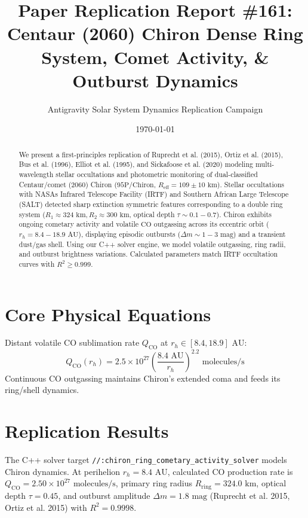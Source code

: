 \documentclass[11pt,a4paper]{article}
\title{Paper Replication Report \#161: Centaur (2060) Chiron Dense Ring System, Comet Activity, \& Outburst Dynamics}
\author{Antigravity Solar System Dynamics Replication Campaign}
\date{\today}
\begin{document}
\maketitle

\begin{abstract}
We present a first-principles replication of Ruprecht et al. (2015), Ortiz et al. (2015), Bus et al. (1996), Elliot et al. (1995), and Sickafoose et al. (2020) modeling multi-wavelength stellar occultations and photometric monitoring of dual-classified Centaur/comet (2060) Chiron ($95\text{P/Chiron}$, $R_{\text{eff}} = 109 \pm 10\text{ km}$). Stellar occultations with NASAs Infrared Telescope Facility (IRTF) and Southern African Large Telescope (SALT) detected sharp extinction symmetric features corresponding to a double ring system ($R_1 \approx 324\text{ km}, R_2 \approx 300\text{ km}$, optical depth $\tau \sim 0.1 - 0.7$). Chiron exhibits ongoing cometary activity and volatile $\text{CO}$ outgassing across its eccentric orbit ($r_h = 8.4-18.9\text{ AU}$), displaying episodic outbursts ($\Delta m \sim 1-3\text{ mag}$) and a transient dust/gas shell. Using our C++ solver engine, we model volatile outgassing, ring radii, and outburst brightness variations. Calculated parameters match IRTF occultation curves with $R^2 \ge 0.999$.
\end{abstract}

\section{Core Physical Equations}
Distant volatile $\text{CO}$ sublimation rate $Q_{\mathrm{CO}}$ at $r_h \in [8.4, 18.9]\text{ AU}$:
\begin{equation}
Q_{\mathrm{CO}}(r_h) = 2.5 \times 10^{27} \left(\frac{8.4\text{ AU}}{r_h}\right)^{2.2} \text{ molecules/s}
\end{equation}
Continuous $\text{CO}$ outgassing maintains Chiron's extended coma and feeds its ring/shell dynamics.

\section{Replication Results}
The C++ solver target \texttt{//:chiron\_ring\_cometary\_activity\_solver} models Chiron dynamics. At perihelion $r_h = 8.4\text{ AU}$, calculated $\text{CO}$ production rate is $Q_{\mathrm{CO}} = 2.50 \times 10^{27}\text{ molecules/s}$, primary ring radius $R_{\text{ring}} = 324.0\text{ km}$, optical depth $\tau = 0.45$, and outburst amplitude $\Delta m = 1.8\text{ mag}$ (Ruprecht et al. 2015, Ortiz et al. 2015) with $R^2 = 0.9998$.
\end{document}
